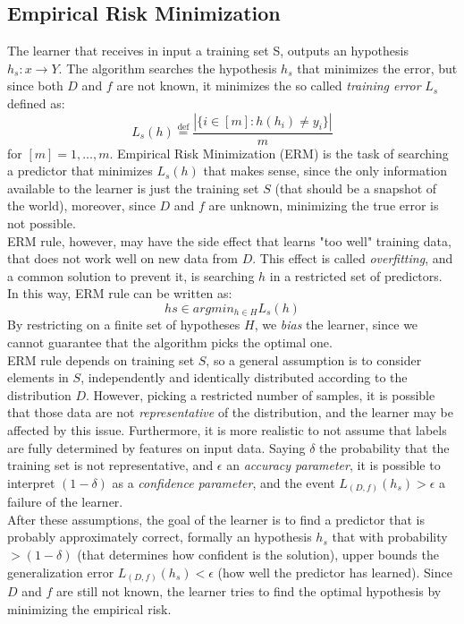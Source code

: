 \subsection{Empirical Risk Minimization}
The learner that receives in input a training set S, outputs an hypothesis $h_s : x \rightarrow Y$. The algorithm searches the hypothesis $h_s$ that minimizes the error, but since both $D$ and $f$ are not known, it minimizes the so called \textit{training error} $L_s$ defined as:
\[ L_s(h) \stackrel{\text{def}}{=} \frac{|\{i \in [m] : h(h_i) \neq y_i\}|}{m} \]
for $[m] = {1, \dots, m}$. Empirical Risk Minimization (ERM) is the task of searching a predictor that minimizes $L_s(h)$ that makes sense, since the only information available to the learner is just the training set $S$ (that should be a snapshot of the world), moreover, since $D$ and $f$ are unknown, minimizing the true error is not possible.\\
ERM rule, however, may have the side effect that learns "too well" training data, that does not work well on new data from $D$. This effect is called \textit{overfitting}, and a common solution to prevent it, is searching $h$ in a restricted set of predictors. In this way, ERM rule can be written as:
\[hs \in argmin_{h \in H} L_s(h)\]
By restricting on a finite set of hypotheses $H$, we \textit{bias} the learner, since we cannot guarantee that the algorithm picks the optimal one.\\

ERM rule depends on training set $S$, so a general assumption is to consider elements in $S$, independently and identically distributed according to the distribution $D$. However, picking a restricted number of samples, it is possible that those data are not \textit{representative} of the distribution, and the learner may be affected by this issue. Furthermore, it is more realistic to not assume that labels are fully determined by features on input data. Saying $\delta$ the probability that the training set is not representative, and $\epsilon$ an \textit{accuracy parameter}, it is possible to interpret $(1-\delta)$ as a \textit{confidence parameter}, and the event $L_{(D,f)}(h_s) > \epsilon$ a failure of the learner.\\
After these assumptions, the goal of the learner is to find a predictor that is probably approximately correct, formally an hypothesis $h_s$ that with probability $> (1-\delta)$ (that determines how confident is the solution), upper bounds the generalization error $L_{(D,f)}(h_s) < \epsilon$ (how well the predictor has learned). Since $D$ and $f$ are still not known, the learner tries to find the optimal hypothesis by minimizing the empirical risk.\\

